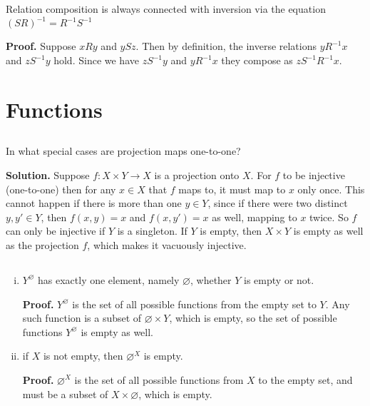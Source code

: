 \documentclass{article}
\begin{document}
\subsection{} Relation composition is always connected with inversion via the equation $(SR)^{-1} = R^{-1}S^{-1}$

\textbf{Proof.} Suppose $xRy$ and $ySz$. Then by definition, the inverse relations $yR^{-1}x$ and $zS^{-1}y$ hold. Since we have $zS^{-1}y$ and $yR^{-1}x$ they compose as $z S^{-1}R^{-1} x$. 

\section{Functions}

\subsection{} In what special cases are projection maps one-to-one?

\textbf{Solution.} Suppose $f: X \times Y \longrightarrow X$ is a projection onto $X$. For $f$ to be injective (one-to-one) then for any $x \in X$ that $f$ maps to, it must map to $x$ only once. This cannot happen if there is more than one $y \in Y$, since if there were two distinct $y, y' \in Y$, then $f(x, y) = x$ and $f(x, y') = x$ as well, mapping to $x$ twice. So $f$ can only be injective if $Y$ is a singleton. If $Y$ is empty, then $X \times Y$ is empty as well as the projection $f$, which makes it vacuously injective.

\subsection{}
\begin{enumerate}[(i)]
    \item $Y^\varnothing$ has exactly one element, namely $\varnothing$, whether $Y$ is empty or not.
    
    \textbf{Proof.} $Y^\varnothing$ is the set of all possible functions from the empty set to $Y$. Any such function is a subset of $\varnothing \times Y$, which is empty, so the set of possible functions $Y^\varnothing$ is empty as well. 

    \item if $X$ is not empty, then $\varnothing^X$ is empty.

    \textbf{Proof.} $\varnothing^X$ is the set of all possible functions from $X$ to the empty set, and must be a subset of $X \times \varnothing$, which is empty.
\end{enumerate}
\end{document}

